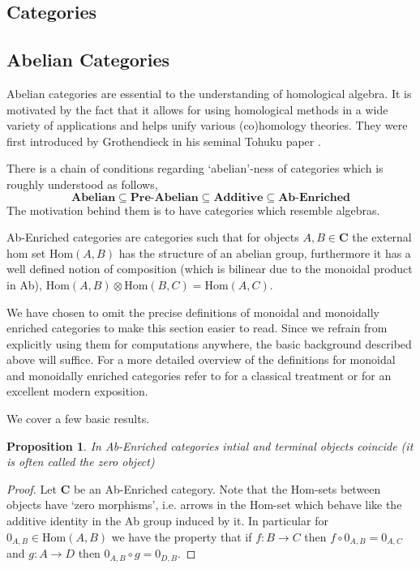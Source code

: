 \documentclass[12pt]{article}
\numberwithin{equation}{section}
\newcommand{\Hom}{{\mathrm{Hom}}}
\newcounter{dummy} \numberwithin{dummy}{section}
\newtheorem{proposition}[dummy]{Proposition}
\begin{document}
\begin{appendices}
	\section{Categories}
	\subsection{Abelian Categories}
	Abelian categories are essential to the understanding of homological algebra. It is motivated by the fact that it allows for using homological methods in a wide variety of applications and helps unify various (co)homology theories. They were first introduced by Grothendieck in his seminal Tohuku paper \cite{grothendieck1957quelques}.
	
	There is a chain of conditions regarding `abelian'-ness of categories which is roughly understood as follows,
	\[ \textbf{Abelian} \subseteq \textbf{Pre-Abelian} \subseteq \textbf{Additive} \subseteq \textbf{Ab-Enriched}\]
	The motivation behind them is to have categories which resemble algebras.
	
	Ab-Enriched categories are categories such that for objects $A,B \in \mathbf{C}$ the external hom set $\Hom(A,B)$ has the structure of an abelian group, furthermore it has a well defined notion of composition (which is bilinear due to the monoidal product in Ab), $\Hom(A,B)\otimes \Hom(B,C) =\Hom(A,C)$. 
	
	We have chosen to omit the precise definitions of monoidal and monoidally enriched categories to make this section easier to read. Since we refrain from explicitly using them for computations anywhere, the basic background described above will suffice. For a more detailed overview of the definitions for monoidal and monoidally enriched categories refer to \cite{lane1998categories} for a classical treatment or \cite{riehl2017category} for an excellent modern exposition. 
	
	We cover a few basic results.
	
	\begin{proposition}
		In Ab-Enriched categories intial and terminal objects coincide (it is often called the zero object)
	\end{proposition}
	\begin{proof}
		Let $\mathbf{C}$ be an Ab-Enriched category. Note that the Hom-sets between objects have `zero morphisms', i.e. arrows in the Hom-set which behave like the additive identity in the Ab group induced by it. In particular for $0_{A,B}\in \Hom(A,B)$ we have the property that if $f:B \to C$ then $f\circ 0_{A,B}=0_{A,C}$ and $g: A \to D$ then $0_{A,B}\circ g=0_{D,B}$.
		

\end{proof}
\end{appendices}
\end{document}
